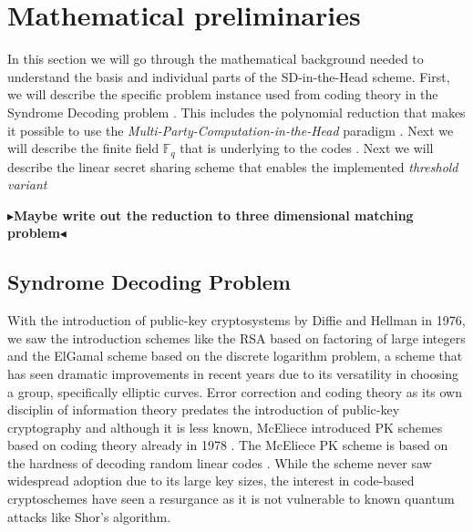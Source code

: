 \documentclass[twoside,11pt,openright]{report}
\theoremstyle{definition}
\theoremstyle{plain}
\newcommand{\todo}[1]{{\color[rgb]{.5,0,0}\textbf{$\blacktriangleright$#1$\blacktriangleleft$}}}
\begin{document}
\chapter{Mathematical preliminaries}
\label{ch:mathprelim}

In this section we will go through the mathematical background needed to understand the basis and individual parts of the SD-in-the-Head scheme. First, we will describe the specific problem instance used from coding theory in the Syndrome Decoding problem \cite{aguilarsyndrome11,mceliece1978public,berlekamp1978inherent, baldi2013optimization}. This includes the polynomial reduction that makes it possible to use the \textit{Multi-Party-Computation-in-the-Head} paradigm \cite{baum2020concretely}. Next we will describe the finite field $\mathbb{F}_q$ that is underlying to the codes \cite{martinez2023syndromes, reed1960polynomial}. Next we will describe the linear secret sharing scheme that enables the implemented \textit{threshold variant}~\cite{feneuil2023threshold}

\todo{Maybe write out the reduction to three dimensional matching problem}

\section{Syndrome Decoding Problem}
\label{sec:syndrome}
With the introduction of public-key cryptosystems by Diffie and Hellman in 1976, we saw the introduction schemes like the RSA based on factoring of large integers and the ElGamal scheme based on the discrete logarithm problem, a scheme that has seen dramatic improvements in recent years due to its versatility in choosing a group, specifically elliptic curves. Error correction and coding theory as its own disciplin of information theory predates the introduction of public-key cryptography and although it is less known, McEliece introduced PK schemes based on coding theory already in 1978 \cite{mceliece1978public}. The McEliece PK scheme is based on the hardness of decoding random linear codes \cite{berlekamp1978inherent}. While the scheme never saw widespread adoption due to its large key sizes, the interest in code-based cryptoschemes have seen a resurgance as it is not vulnerable to known quantum attacks like Shor's algorithm.
\end{document}
